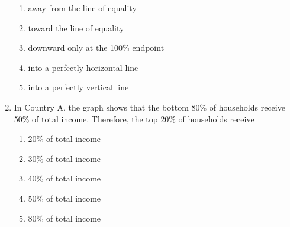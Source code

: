\documentclass[10pt]{article}
\newenvironment{choiceslist}
  {\begin{enumerate}[label=(\Alph*), leftmargin=1.55em, itemsep=0.1em, topsep=0.15em, parsep=0pt]}
  {\end{enumerate}}
\begin{document}
\begin{multicols*}{2}
\begin{enumerate}[resume*=curveq, leftmargin=*, itemsep=0.8em, topsep=0.18em, parsep=0pt]
\begin{choiceslist}
\item away from the line of equality
\item toward the line of equality
\item downward only at the 100\% endpoint
\item into a perfectly horizontal line
\item into a perfectly vertical line
\end{choiceslist}
\item In Country A, the graph shows that the bottom 80\% of households receive 50\% of total income. Therefore, the top 20\% of households receive
\begin{choiceslist}
\item 20\% of total income
\item 30\% of total income
\item 40\% of total income
\item 50\% of total income
\item 80\% of total income
\end{choiceslist}
\end{enumerate}
\end{multicols*}
\label{LastPage}
\end{document}
